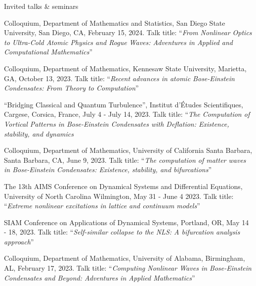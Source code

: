 \documentclass[10pt]{article} %
\begin{document}
\begin{section}{Invited talks \& seminars}
\begin{etaremune}
\item Colloquium, Department of Mathematics and Statistics, San Diego State University, San Diego, CA, February 15, 2024.
Talk title: ``\textit{From Nonlinear Optics to Ultra-Cold Atomic Physics and Rogue Waves:
Adventures in Applied and Computational Mathematics}''

\item  Colloquium, Department of Mathematics, Kennesaw State University, Marietta, GA, October 13, 2023.
Talk title: ``\textit{Recent advances in atomic Bose-Einstein Condensates: From Theory to Computation}''

\item ``Bridging Classical and Quantum Turbulence'',
Institut d'\'Etudes Scientifiques, Cargese, Corsica, France, July 4 - July 14, 2023.
Talk title: ``\textit{The Computation of Vortical Patterns in Bose-Einstein Condensates with
Deflation: Existence, stability, and dynamics}

\item Colloquium, Department of Mathematics, University of California Santa Barbara, Santa Barbara, CA, June 9, 2023.
Talk title: ``\textit{The computation of matter waves in Bose-Einstein Condensates: Existence, stability, and bifurcations}''


\item The 13th AIMS Conference on Dynamical Systems and Differential Equations, University of North Carolina Wilmington, %
May 31 - June 4 2023. Talk title: ``\textit{Extreme nonlinear excitations in lattice and continuum models}''

\item SIAM Conference on Applications of Dynamical Systems, Portland, OR, May 14 - 18, 2023. 
Talk title: ``\textit{Self-similar collapse to the NLS: A bifurcation analysis approach}''

\item Colloquium, Department of Mathematics, University of Alabama, Birmingham, AL, February 17, 2023. 
Talk title: ``\textit{Computing Nonlinear Waves in Bose-Einstein Condensates and Beyond: Adventures in 
Applied Mathematics}''


\end{etaremune}
\end{section}
\end{document}

